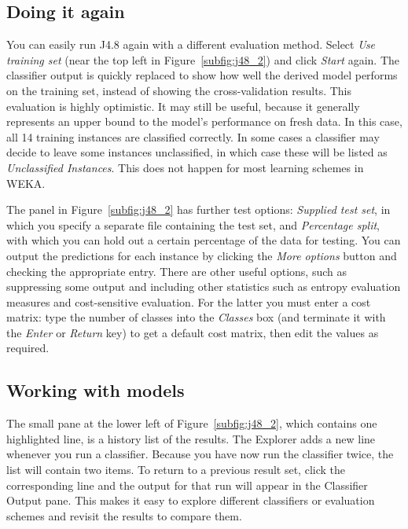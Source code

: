 \subsection{Doing it again}
\label{subsec:doing_it_again}

You can easily run J4.8 again with a different evaluation
method. Select {\em Use training set} (near the top left in
Figure~\ref{subfig:j48_2}) and click \textit{Start} again. The
classifier output is quickly replaced to show how well the derived
model performs on the training set, instead of showing the
cross-validation results. This evaluation is highly optimistic. It may
still be useful, because it generally represents an upper bound to the
model's performance on fresh data. In this case, all 14 training
instances are classified correctly. In some cases a classifier may
decide to leave some instances unclassified, in which case these will
be listed as \textit{Unclassified Instances}. This does not happen for
most learning schemes in WEKA.

The panel in Figure~\ref{subfig:j48_2} has further test options:
\textit{Supplied test set}, in which you specify a separate file
containing the test set, and \textit{Percentage split}, with which you
can hold out a certain percentage of the data for testing. You can
output the predictions for each instance by clicking the \textit{More
  options} button and checking the appropriate entry. There are other
useful options, such as suppressing some output and including other
statistics such as entropy evaluation measures and cost-sensitive
evaluation. For the latter you must enter a cost matrix: type the
number of classes into the \textit{Classes} box (and terminate it with
the \textit{Enter} or \textit{Return} key) to get a default cost
matrix, then edit the values as required.

\subsection{Working with models}

The small pane at the lower left of Figure~\ref{subfig:j48_2}, which
contains one highlighted line, is a history list of the results. The
Explorer adds a new line whenever you run a classifier. Because you
have now run the classifier twice, the list will contain two items. To
return to a previous result set, click the corresponding line and the
output for that run will appear in the Classifier Output pane. This
makes it easy to explore different classifiers or evaluation schemes
and revisit the results to compare them.

